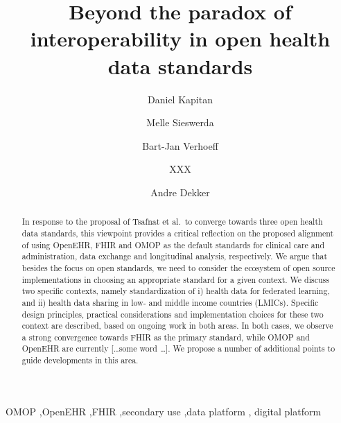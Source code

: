 \documentclass[
  authoryear]{elsarticle}
\begin{document}
\begin{frontmatter}
\title{Beyond the paradox of interoperability in open health data
standards}
\author[1,2,3]{Daniel Kapitan%
%
}
\author[4,5]{Melle Sieswerda%
%
}

\author[6]{Bart-Jan Verhoeff%
%
}

\author[2]{XXX%
%
}

\author[5]{Andre Dekker%
%
}








        
\begin{abstract}
In response to the proposal of Tsafnat et al.~to converge towards three
open health data standards, this viewpoint provides a critical
reflection on the proposed alignment of using OpenEHR, FHIR and OMOP as
the default standards for clinical care and administration, data
exchange and longitudinal analysis, respectively. We argue that besides
the focus on open standards, we need to consider the ecosystem of open
source implementations in choosing an appropriate standard for a given
context. We discuss two specific contexts, namely standardization of i)
health data for federated learning, and ii) health data sharing in low-
and middle income countries (LMICs). Specific design principles,
practical considerations and implementation choices for these two
context are described, based on ongoing work in both areas. In both
cases, we observe a strong convergence towards FHIR as the primary
standard, while OMOP and OpenEHR are currently {[}\ldots some word
\ldots{]}. We propose a number of additional points to guide
developments in this area.
\end{abstract}





\begin{keyword}
    OMOP \sep OpenEHR \sep FHIR \sep secondary use \sep data
platform \sep 
    digital platform
\end{keyword}
\end{frontmatter}
    
\end{document}
